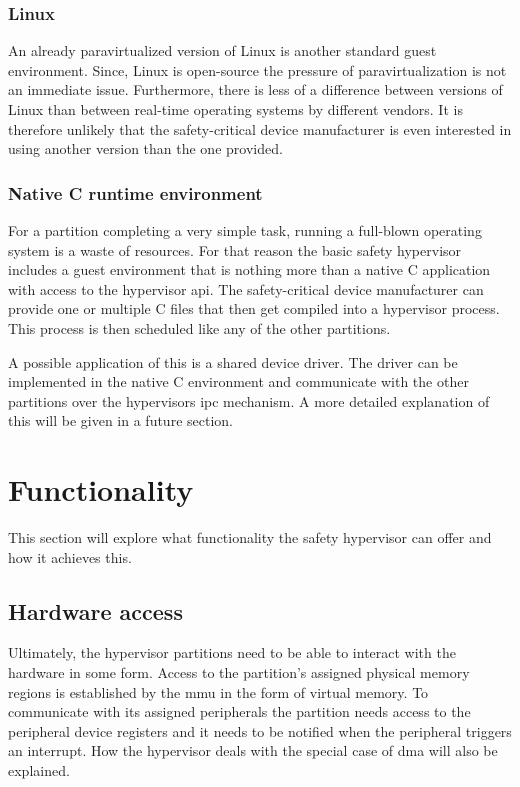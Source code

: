 \subsubsection{Linux}
An already paravirtualized version of Linux is another standard guest environment. Since, Linux is open-source the pressure of paravirtualization is not an immediate issue. Furthermore, there is less of a difference between versions of Linux than between real-time operating systems by different vendors. It is therefore unlikely that the safety-critical device manufacturer is even interested in using another version than the one provided.

\subsubsection{Native C runtime environment}
For a partition completing a very simple task, running a full-blown operating system is a waste of resources. For that reason the basic safety hypervisor includes a guest environment that is nothing more than a native C application with access to the hypervisor \acrshort{api}. The safety-critical device manufacturer can provide one or multiple C files that then get compiled into a hypervisor process. This process is then scheduled like any of the other partitions.

A possible application of this is a shared device driver. The driver can be implemented in the native C environment and communicate with the other partitions over the hypervisors \acrshort{ipc} mechanism. A more detailed explanation of this will be given in a future section.


\section{Functionality}
This section will explore what functionality the safety hypervisor can offer and how it achieves this.
\subsection{Hardware access}
Ultimately, the hypervisor partitions need to be able to interact with the hardware in some form. Access to the partition's assigned physical memory regions is established by the \acrshort{mmu} in the form of virtual memory.
To communicate with its assigned peripherals the partition needs access to the peripheral device registers and it needs to be notified when the peripheral triggers an interrupt. How the hypervisor deals with the special case of \acrfull{dma} will also be explained.

